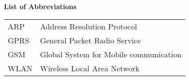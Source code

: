 %
%
% 
% 
% 

\noindent
{\Large\bfseries List of Abbreviations}
\vspace{0.65cm}

\begin{table*}[htbp]
		\begin{tabular}{ll}
			ARP & Address Resolution Protocol \\
			GPRS & General Packet Radio Service \\
			GSM  &  Global System for Mobile communication \\
			WLAN & Wireless Local Area Network \\
		\end{tabular}
\end{table*}